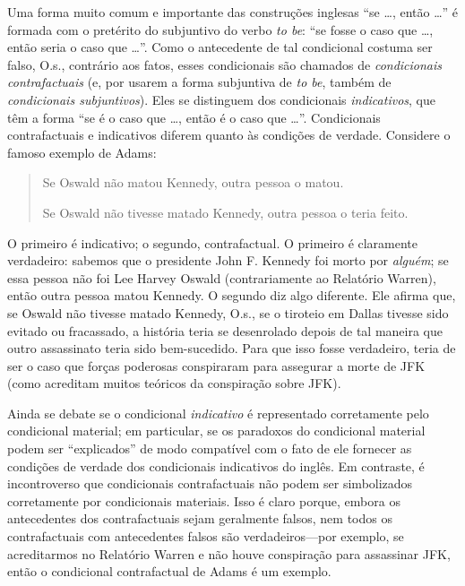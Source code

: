 \documentclass[../../../include/open-logic-section]{subfiles}
\begin{document}


Uma forma muito comum e importante das construções inglesas ``se
\dots, então \dots'' é formada com o pretérito do subjuntivo do verbo
\emph{to be}: ``se fosse o caso que \dots, então seria o caso que
\dots''. Como o antecedente de tal condicional costuma ser falso, O.s.\@,
contrário aos fatos, esses condicionais são chamados de \emph{condicionais
  contrafactuais} (e, por usarem a forma subjuntiva de \emph{to
  be}, também de \emph{condicionais subjuntivos}). Eles se distinguem
dos condicionais \emph{indicativos}, que têm a forma ``se é o caso que
\dots, então é o caso que \dots''. Condicionais contrafactuais e
indicativos diferem quanto às condições de verdade. Considere o famoso
exemplo de Adams:
\begin{quote}
  Se Oswald não matou Kennedy, outra pessoa o matou.
  
  Se Oswald não tivesse matado Kennedy, outra pessoa o teria feito.
\end{quote}
O primeiro é indicativo; o segundo, contrafactual. O primeiro é
claramente verdadeiro: sabemos que o presidente John F. Kennedy foi morto por \emph{alguém}; se essa pessoa
não foi Lee Harvey Oswald (contrariamente ao Relatório Warren), então outra pessoa
matou Kennedy. O segundo diz algo diferente. Ele afirma
que, se Oswald não tivesse matado Kennedy, O.s.\@, se o tiroteio em Dallas tivesse
sido evitado ou fracassado, a história teria se desenrolado depois
de tal maneira que outro assassinato teria sido
bem-sucedido. Para que isso fosse verdadeiro, teria de ser o caso
que forças poderosas conspiraram para assegurar a morte de JFK (como acreditam muitos
teóricos da conspiração sobre JFK).

Ainda se debate se o condicional \emph{indicativo} é
representado corretamente pelo condicional material; em particular, se
os paradoxos do condicional material podem ser ``explicados'' de modo
compatível com o fato de ele fornecer as condições de verdade dos condicionais
indicativos do inglês. Em contraste, é incontroverso que
condicionais contrafactuais não podem ser simbolizados corretamente por
condicionais materiais. Isso é claro porque, embora os antecedentes
dos contrafactuais sejam geralmente falsos, nem todos os contrafactuais
com antecedentes falsos são verdadeiros---por exemplo, se acreditarmos no
Relatório Warren e não houve conspiração para assassinar JFK, então
o condicional contrafactual de Adams é um exemplo.
\end{document}
